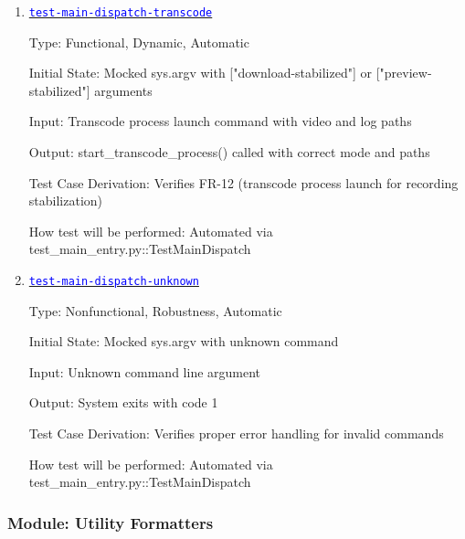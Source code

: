 \documentclass[12pt, titlepage]{article}
\newcommand{\tid}[1]{\hyperlink{tid:#1}{\textcolor{blue}{\texttt{#1}}}}
\begin{document}
\begin{enumerate}
        How test will be performed: Automated via
        test\_main\_entry.py::TestMainDispatch

  \item{\tid{test-main-dispatch-transcode}\\}

        Type: Functional, Dynamic, Automatic

        Initial State: Mocked sys.argv with ["download-stabilized"] or
          ["preview-stabilized"] arguments

        Input: Transcode process launch command with video and log paths

        Output: start\_transcode\_process() called with correct mode and paths

        Test Case Derivation: Verifies FR-12 (transcode process launch for recording
        stabilization)

        How test will be performed: Automated via
        test\_main\_entry.py::TestMainDispatch

  \item{\tid{test-main-dispatch-unknown}\\}

        Type: Nonfunctional, Robustness, Automatic

        Initial State: Mocked sys.argv with unknown command

        Input: Unknown command line argument

        Output: System exits with code 1

        Test Case Derivation: Verifies proper error handling for invalid commands

        How test will be performed: Automated via
        test\_main\_entry.py::TestMainDispatch

\end{enumerate}

\subsubsection{Module: Utility Formatters}
\end{document}
